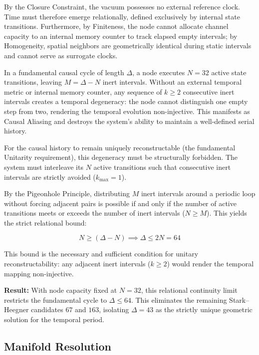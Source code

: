 By the Closure Constraint, the vacuum possesses no external reference clock. Time must therefore emerge relationally, defined exclusively by internal state transitions. Furthermore, by Finiteness, the node cannot allocate channel capacity to an internal memory counter to track elapsed empty intervals; by Homogeneity, spatial neighbors are geometrically identical during static intervals and cannot serve as surrogate clocks.

In a fundamental causal cycle of length $\Delta$, a node executes $N = 32$ active state transitions, leaving $M = \Delta - N$ inert intervals. Without an external temporal metric or internal memory counter, any sequence of $k \ge 2$ consecutive inert intervals creates a temporal degeneracy: the node cannot distinguish one empty step from two, rendering the temporal evolution non-injective. This manifests as Causal Aliasing and destroys the system's ability to maintain a well-defined serial history.

For the causal history to remain uniquely reconstructable (the fundamental Unitarity requirement), this degeneracy must be structurally forbidden. The system must interleave its $N$ active transitions such that consecutive inert intervals are strictly avoided ($k_{\text{max}} = 1$).

By the Pigeonhole Principle, distributing $M$ inert intervals around a periodic loop without forcing adjacent pairs is possible if and only if the number of active transitions meets or exceeds the number of inert intervals ($N \ge M$). This yields the strict relational bound:

\begin{equation}
    N \ge (\Delta - N) \implies \Delta \le 2N = 64
\end{equation}

This bound is the necessary and sufficient condition for unitary reconstructability: any adjacent inert intervals ($k \ge 2$) would render the temporal mapping non-injective.

\textbf{Result:} With node capacity fixed at $N = 32$, this relational continuity limit restricts the fundamental cycle to $\Delta \le 64$. This eliminates the remaining Stark--Heegner candidates $67$ and $163$, isolating $\Delta = 43$ as the strictly unique geometric solution for the temporal period.

\subsection{Manifold Resolution}
\label{subsec:manifold_resolution}

